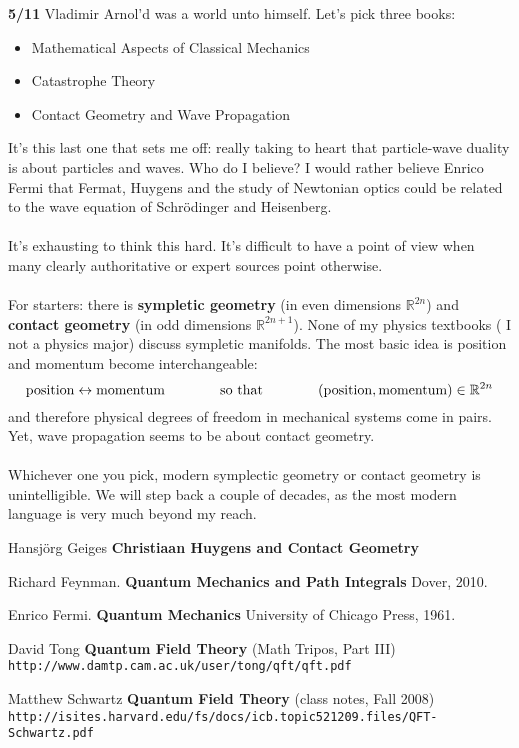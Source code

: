 \documentclass[12pt]{article}
\begin{document}
\newpage

\noindent \textbf{5/11} Vladimir Arnol'd was a world unto himself.  Let's pick three books:
\begin{itemize}
\item Mathematical Aspects of Classical Mechanics 
\item Catastrophe Theory
\item Contact Geometry and Wave Propagation
\end{itemize}
It's this last one that sets me off: really taking to heart that particle-wave duality is about particles and waves.  Who do I believe?  I would rather believe Enrico Fermi that Fermat, Huygens and the study of Newtonian optics could be related to the wave equation of Schr\"{o}dinger and Heisenberg.  \\ \\
It's exhausting to think this hard.  It's difficult to have a point of view when many clearly authoritative or expert sources point otherwise.  \\ \\
For starters: there is \textbf{sympletic geometry} (in even dimensions $\mathbb{R}^{2n}$) and \textbf{contact geometry} (in odd dimensions $\mathbb{R}^{2n+1}$).  None of my physics textbooks ( I not a physics major) discuss sympletic manifolds.  The most basic idea is position and momentum become interchangeable: 
$$\text{position} \leftrightarrow \text{momentum} \hspace{0.5in}\text{ so that }\hspace{0.5in} (\text{position}, \text{momentum}) \in \mathbb{R}^{2n} $$
and therefore physical degrees of freedom in mechanical systems come in pairs.  Yet, wave propagation seems to be about contact geometry. \\ \\
Whichever one you pick, modern symplectic geometry or contact geometry is unintelligible.  We will step back a couple of decades, as the most modern language is very much beyond my reach. 

\vfill

\begin{thebibliography}{}

\item Hansj\"{o}rg Geiges \textbf{Christiaan Huygens and Contact Geometry}

\item Richard Feynman.  \textbf{Quantum Mechanics and Path Integrals} Dover, 2010.

\item Enrico Fermi.  \textbf{Quantum Mechanics} University of Chicago Press, 1961.

\item David Tong \textbf{Quantum Field Theory} (Math Tripos, Part III)  \\ \texttt{http://www.damtp.cam.ac.uk/user/tong/qft/qft.pdf}

\item Matthew Schwartz \textbf{Quantum Field Theory} (class notes, Fall 2008) \\
\texttt{http://isites.harvard.edu/fs/docs/icb.topic521209.files/QFT-Schwartz.pdf}

\end{thebibliography}
\end{document}
